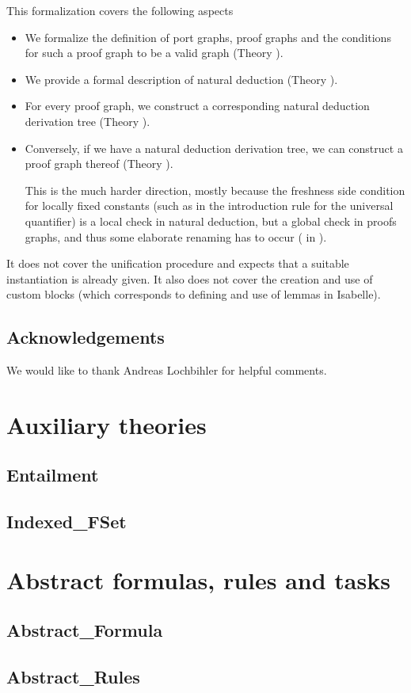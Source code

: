 \documentclass[11pt,a4paper,parskip=half]{scrartcl}
\begin{document}
This formalization covers the following aspects
\begin{itemize}
\item We formalize the definition of port graphs, proof graphs and the conditions for such a proof
      graph to be a valid graph (Theory ).
\item We provide a formal description of natural deduction (Theory ).
\item For every proof graph, we construct a corresponding natural deduction derivation tree
      (Theory  ).
\item Conversely, if we have a natural deduction derivation tree, we can construct a proof graph
      thereof (Theory ).
      
      This is the much harder direction, mostly because the freshness side condition for locally
      fixed constants (such as in the introduction rule for the universal quantifier) is a local
      check in natural deduction, but a global check in proofs graphs, and thus some elaborate
      renaming has to occur ( in ).
\end{itemize}

It does not cover the unification procedure and expects that a suitable instantiation is already
given. It also does not cover the creation and use of custom blocks (which corresponds to defining 
and use of lemmas in Isabelle).


\subsection{Acknowledgements}

We would like to thank Andreas Lochbihler for helpful comments.

\clearpage
\newcommand{\theory}[1]{\subsection{#1}\label{sec\string_#1}}

\section{Auxiliary theories}
\label{ch\string_aux}

\theory{Entailment}
\theory{Indexed\string_FSet}

\section{Abstract formulas, rules and tasks}
\theory{Abstract\string_Formula}
\theory{Abstract\string_Rules}
\end{document}
